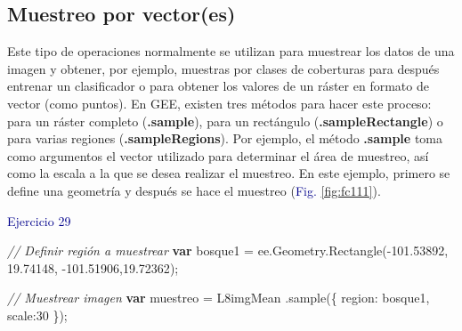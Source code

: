 \documentclass[
  12pt,
  letterpaper,
  twoside]{book}
\newenvironment{Shaded}{\begin{snugshade}}{\end{snugshade}}
\newcommand{\AttributeTok}[1]{\textcolor[rgb]{0.48,0.12,0.64}{#1}}
\newcommand{\CommentTok}[1]{\textcolor[rgb]{0.24,0.58,0.00}{\textit{#1}}}
\newcommand{\ControlFlowTok}[1]{\textcolor[rgb]{0.00,0.00,0.00}{\textbf{#1}}}
\newcommand{\DataTypeTok}[1]{\textcolor[rgb]{0.00,0.00,0.00}{#1}}
\newcommand{\DecValTok}[1]{\textcolor[rgb]{0.28,0.53,0.93}{#1}}
\newcommand{\FloatTok}[1]{\textcolor[rgb]{0.28,0.53,0.93}{#1}}
\newcommand{\FunctionTok}[1]{\textcolor[rgb]{0.48,0.12,0.64}{#1}}
\newcommand{\KeywordTok}[1]{\textcolor[rgb]{0.48,0.12,0.64}{#1}}
\newcommand{\NormalTok}[1]{#1}
\newcommand{\OperatorTok}[1]{\textcolor[rgb]{0.00,0.00,0.00}{#1}}
\newcommand\boldpurple[1]{\textcolor{darkpurple}{\textbf{#1}}}
\begin{document}
\hypertarget{muestreo-por-vectores}{%
\subsection*{Muestreo por vector(es)}\label{muestreo-por-vectores}}

   Este tipo
de operaciones normalmente se utilizan para muestrear los datos de una
imagen y obtener, por ejemplo, muestras por clases de coberturas para
después entrenar un clasificador o para obtener los valores de un ráster
en formato de vector (como puntos). En GEE, existen tres métodos para
hacer este proceso: para un ráster completo (\boldpurple{.sample}), para un
rectángulo (\boldpurple{.sampleRectangle}) o para varias regiones
(\boldpurple{.sampleRegions}). Por ejemplo, el método \boldpurple{.sample} toma como
argumentos el vector utilizado para determinar el área de muestreo, así
como la escala a la que se desea realizar el muestreo. En este ejemplo,
primero se define una geometría y después se hace el muestreo
(\textcolor{darkblue}{Fig.} \ref{fig:fc111}).

\textcolor{darkblue}{Ejercicio 29}

\begin{Shaded}
\begin{Highlighting}[]
\CommentTok{// Definir región a muestrear}
\ControlFlowTok{var}\NormalTok{ bosque1 }\OperatorTok{=} \KeywordTok{ee}\OperatorTok{.}\AttributeTok{Geometry}\OperatorTok{.}\FunctionTok{Rectangle}\NormalTok{(}\OperatorTok{{-}}\FloatTok{101.53892}\OperatorTok{,} \FloatTok{19.74148}\OperatorTok{,} 
  \OperatorTok{{-}}\FloatTok{101.51906}\OperatorTok{,}\FloatTok{19.72362}\NormalTok{)}\OperatorTok{;}
\end{Highlighting}
\end{Shaded}

\begin{Shaded}
\begin{Highlighting}[]
\CommentTok{// Muestrear imagen}
\ControlFlowTok{var}\NormalTok{ muestreo }\OperatorTok{=}\NormalTok{ L8imgMean}
  \OperatorTok{.}\FunctionTok{sample}\NormalTok{(\{}
    \DataTypeTok{region}\OperatorTok{:}\NormalTok{ bosque1}\OperatorTok{,}
    \DataTypeTok{scale}\OperatorTok{:}\DecValTok{30}
\NormalTok{  \})}\OperatorTok{;}
\end{Highlighting}
\end{Shaded}
\end{document}
